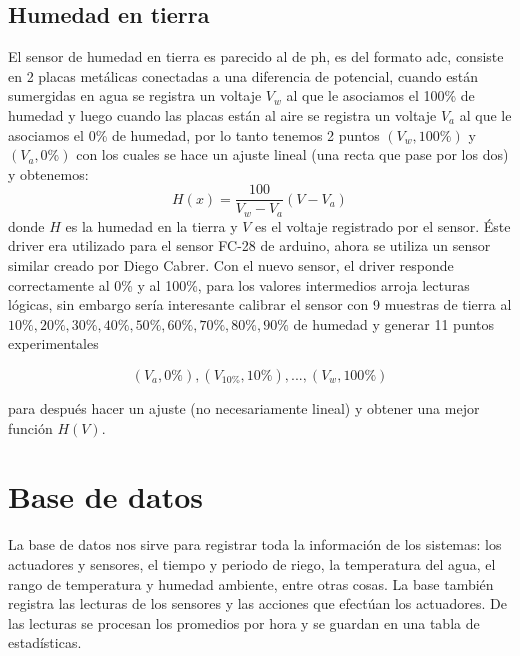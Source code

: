 \documentclass[10pt,twocolumn]{article}
\begin{document}
\subsection{Humedad en tierra}
El sensor de humedad en tierra es parecido al de ph, es del formato adc, consiste en 2 placas met\'alicas conectadas a una diferencia de potencial, cuando est\'an 
sumergidas en agua se registra un voltaje $V_w$ al que le asociamos el 100\% de humedad y luego cuando las placas est\'an al aire se registra un voltaje $V_a$ al que le 
asociamos el 0\% de humedad, por lo tanto tenemos 2 puntos $(V_w,100\%)$ y $(V_a,0\%)$ con los cuales se hace un ajuste lineal (una recta que pase por los 
dos) y obtenemos:
\begin{equation}
	H(x)=\frac{100}{V_{w}-V_{a}}(V-V_{a})
\end{equation}
donde $H$ es la humedad en la tierra y $V$ es el voltaje registrado por el sensor. \'Este driver era utilizado para el sensor FC-28 de arduino, ahora se utiliza un sensor 
similar creado por Diego Cabrer. Con el nuevo sensor, el driver responde correctamente al 
0\% y al 100\%, para los valores intermedios arroja lecturas l\'ogicas, sin embargo ser\'ia interesante calibrar 
el sensor con 9 muestras de tierra al $10\%, 20\%, 30\%, 40\%, 50\%, 60\%, 70\%, 80\%, 90\%$ de humedad y generar 11 puntos experimentales

\begin{equation}
(V_{a},0\%) , (V_{10\%},10\%), ... , (V_{w},100\%)
\end{equation}

para despu\'es hacer un ajuste (no necesariamente lineal) y obtener una mejor funci\'on $H(V)$.

\section{Base de datos}
La base de datos nos sirve para registrar toda la informaci\'on de los 
sistemas: los actuadores y sensores, el tiempo y periodo de 
riego, la temperatura del agua, el rango de temperatura y humedad 
ambiente, entre otras cosas. La base tambi\'en registra las lecturas de 
los sensores y las acciones que efect\'uan los actuadores. De las 
lecturas se procesan los promedios por hora y se 
guardan en una tabla de estad\'isticas.
 
\end{document}
